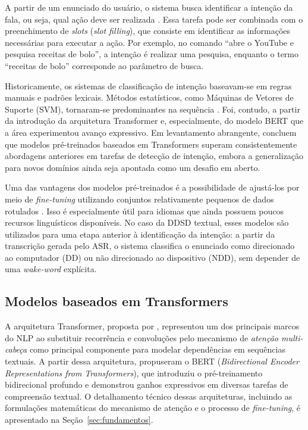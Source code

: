 \documentclass[
    12pt,                %
    openright,           %
    oneside,             %
    a4paper,             %
    english,             %
    brazil               %
]{abntex2}
\begin{document}
A partir de um enunciado do usuário, o sistema busca identificar a intenção da fala, ou seja, qual ação deve ser realizada \cite{Weld2023}. Essa tarefa pode ser combinada com o preenchimento de \textit{slots} (\textit{slot filling}), que consiste em identificar as informações necessárias para executar a ação. Por exemplo, no comando ``abre o YouTube e pesquisa receitas de bolo'', a intenção é realizar uma pesquisa, enquanto o termo ``receitas de bolo'' corresponde ao parâmetro de busca.

Historicamente, os sistemas de classificação de intenção baseavam-se em regras manuais e padrões lexicais. Métodos estatísticos, como Máquinas de Vetores de Suporte (SVM), tornaram-se predominantes na sequência \cite{Manning2008}. Foi, contudo, a partir da introdução da arquitetura Transformer \cite{Vaswani2017} e, especialmente, do modelo BERT \cite{Devlin2019} que a área experimentou avanço expressivo. Em levantamento abrangente,  concluem que modelos pré-treinados baseados em Transformers superam consistentemente abordagens anteriores em tarefas de detecção de intenção, embora a generalização para novos domínios ainda seja apontada como um desafio em aberto.

Uma das vantagens dos modelos pré-treinados é a possibilidade de ajustá-los por meio de \textit{fine-tuning} utilizando conjuntos relativamente pequenos de dados rotulados \cite{Devlin2019}. Isso é especialmente útil para idiomas que ainda possuem poucos recursos linguísticos disponíveis. No caso da DDSD textual, esses modelos são utilizados para uma etapa anterior à identificação da intenção: a partir da transcrição gerada pelo ASR, o sistema classifica o enunciado como direcionado ao computador (DD) ou não direcionado ao dispositivo (NDD), sem depender de uma \textit{wake-word} explícita.

\subsection{Modelos baseados em Transformers}

A arquitetura Transformer, proposta por , representou um dos principais marcos do NLP ao substituir recorrência e convoluções pelo mecanismo de \textit{atenção multi-cabeça} como principal componente para modelar dependências em sequências textuais. A partir dessa arquitetura,  propuseram o BERT (\textit{Bidirectional Encoder Representations from Transformers}), que introduziu o pré-treinamento bidirecional profundo e demonstrou ganhos expressivos em diversas tarefas de compreensão textual. O detalhamento técnico dessas arquiteturas, incluindo as formulações matemáticas do mecanismo de atenção e o processo de \textit{fine-tuning}, é apresentado na Seção~\ref{sec:fundamentos}.
\end{document}
